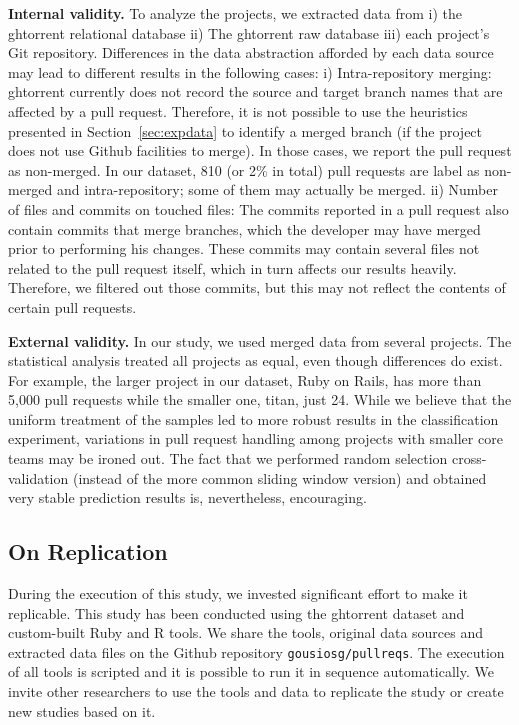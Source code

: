 \documentclass{acm_proc_article-sp}
\begin{document}
\textbf{Internal validity.}
To analyze the projects, we extracted data from i) the {\sc ght}orrent relational
database ii) The {\sc ght}orrent raw database iii) each project's Git repository.
Differences in the data abstraction afforded by each data source may
lead to different results in the following cases: 
i) Intra-repository merging: {\sc ght}orrent currently does not record the source
    and target branch names that are affected by a pull request. Therefore, it
    is not possible to use the heuristics presented in
    Section~\ref{sec:expdata} to identify a merged branch (if the project
    does not use Github facilities to merge). In those cases, we
    report the pull request as non-merged. In our dataset, 810 (or 2\% in total)
    pull requests are label as non-merged and intra-repository; some of them may
    actually be merged.
ii) Number of files and commits on touched files: The commits reported
    in a pull request also contain commits that merge branches, which the
    developer may have merged prior to performing his changes. These commits
    may contain several files not related to the pull request itself, which
    in turn affects our results heavily. Therefore, we  
    filtered out those commits, but this may not reflect the contents of 
    certain pull requests.

\textbf{External validity.}
In our study, we used merged data from several projects. The statistical
analysis treated all projects as equal, even though differences do exist.
For example, the larger project in our dataset, Ruby on Rails, 
has more than 5,000 pull requests while the smaller one, \textsf{titan}, just 24.
While we believe that the uniform treatment of the samples led to more robust
results in the classification experiment, variations in pull request
handling among projects with smaller core teams may be ironed out.
The fact that we performed random selection cross-validation (instead
of the more common sliding window version) and obtained very stable prediction
results is, nevertheless, encouraging.

\subsection{On Replication}
During the execution of this study, we invested significant effort to make it
replicable. This study has been conducted using the {\sc ght}orrent dataset and
custom-built Ruby and R tools. We share the tools, original data sources and
extracted data files on the Github repository \texttt{gousiosg/pullreqs}.  The
execution of all tools is scripted and it is possible to run it in sequence
automatically. We invite other researchers to use the tools and data to
replicate the study or create new studies based on it.
\end{document}
